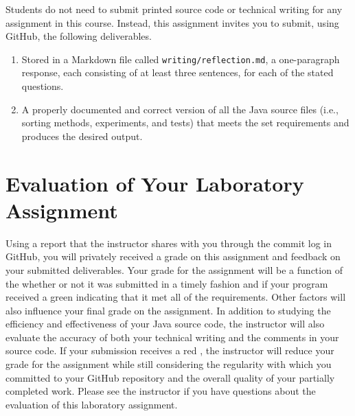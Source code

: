 \documentclass[11pt]{article}
\newcommand{\reflection}{\lstinline{writing/reflection.md}}
\newcommand{\checkmark}{\ding{51}}
\newcommand{\naughtmark}{\ding{55}}
\begin{document}
\noindent Students do not need to submit printed source code or technical writing for any assignment in this course.
Instead, this assignment invites you to submit, using GitHub, the following deliverables.

\begin{enumerate}

  \setlength{\itemsep}{0in}

\item Stored in a Markdown file called \reflection{}, a one-paragraph response,
  each consisting of at least three sentences, for each of the stated questions.

\item A properly documented and correct version of all the Java source files
  (i.e., sorting methods, experiments, and tests) that meets the set
  requirements and produces the desired output.

\end{enumerate}

\section*{Evaluation of Your Laboratory Assignment}

Using a report that the instructor shares with you through the commit log in GitHub, you will privately received a grade
on this assignment and feedback on your submitted deliverables. Your grade for the assignment will be a function of the
whether or not it was submitted in a timely fashion and if your program received a green \checkmark{} indicating that it
met all of the requirements. Other factors will also influence your final grade on the assignment. In addition to
studying the efficiency and effectiveness of your Java source code, the instructor will also evaluate the accuracy of
both your technical writing and the comments in your source code. If your submission receives a red \naughtmark{}, the
instructor will reduce your grade for the assignment while still considering the regularity with which you committed to
your GitHub repository and the overall quality of your partially completed work. Please see the instructor if you have
questions about the evaluation of this laboratory assignment.


\end{document}
